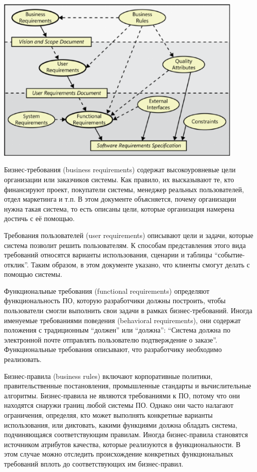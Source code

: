 \documentclass{../../text-style}
\begin{document}
\begin{center}
    \includegraphics[width=0.9\textwidth]{requirements.png}
\end{center}

Бизнес-требования (business requirements) содержат высокоуровневые цели организации или заказчиков системы.
Как правило, их высказывают те, кто финансируют проект, покупатели системы, менеджер реальных пользователей, отдел маркетинга и т.п.
В этом документе объясняется, почему организации нужна такая система, то есть описаны цели, которые организация намерена достичь с её помощью.

Требования пользователей (user requirements) описывают цели и задачи, которые система позволит решить пользователям.
К способам представления этого вида требований относятся варианты использования, сценарии и таблицы \enquote{событие-отклик}.
Таким образом, в этом документе указано, что клиенты смогут делать с помощью системы.

Функциональные требования (functional requirements) определяют функциональность ПО, которую разработчики должны построить, чтобы пользователи смогли выполнить свои задачи в рамках бизнес-требований.
Иногда именуемые требованиями поведения (behavioral requirements), они содержат положения с традиционным \enquote{должен} или \enquote{должна}: \enquote{Система должна по электронной почте отправлять пользователю подтверждение о заказе}.
Функциональные требования описывают, что разработчику необходимо реализовать.

Бизнес-правила (business rules) включают корпоративные политики, правительственные постановления, промышленные стандарты и вычислительные алгоритмы.
Бизнес-правила не являются требованиями к ПО, потому что они находятся снаружи границ любой системы ПО.
Однако они часто налагают ограничения, определяя, кто может выполнять конкретные варианты использования, или диктовать, какими функциями должна обладать система, подчиняющаяся соответствующим правилам.
Иногда бизнес-правила становятся источником атрибутов качества, которые реализуются в функциональности.
В этом случае можно отследить происхождение конкретных функциональных требований вплоть до соответствующих им бизнес-правил.
\end{document}
